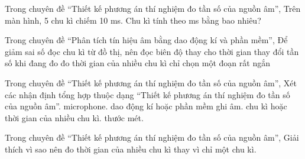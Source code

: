 \begin{ex}
Trong chuyên đề “Thiết kế phương án thí nghiệm đo tần số của nguồn âm”, Trên màn hình, 5 chu kì chiếm 10 ms. Chu kì tính theo ms bằng bao nhiêu?
\end{ex}

\begin{ex}
Trong chuyên đề “Phân tích tín hiệu âm bằng dao động kí và phần mềm”, Để giảm sai số đọc chu kì từ đồ thị, nên
\choice
{đọc biên độ thay cho thời gian}
{thay đổi tần số khi đang đo}
{\True đo thời gian của nhiều chu kì}
{chỉ chọn một đoạn rất ngắn}
\end{ex}

\begin{ex}
Trong chuyên đề “Thiết kế phương án thí nghiệm đo tần số của nguồn âm”, Xét các nhận định tổng hợp thuộc dạng “Thiết kế phương án thí nghiệm đo tần số của nguồn âm”.
\choiceTF
{\True microphone.}
{\True dao động kí hoặc phần mềm ghi âm.}
{\True chu kì hoặc thời gian của nhiều chu kì.}
{thước mét.}
\end{ex}

\begin{ex}
Trong chuyên đề “Thiết kế phương án thí nghiệm đo tần số của nguồn âm”, Giải thích vì sao nên đo thời gian của nhiều chu kì thay vì chỉ một chu kì.
\choiceTF

\end{ex}

